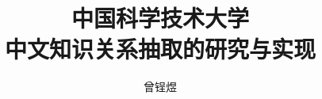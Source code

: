 \documentclass[bachelor]{ustcthesis}
\title{中国科学技术大学\\中文知识关系抽取的研究与实现}
\author{曾锃煜}
\begin{document}
\maketitle

%
%
%

\frontmatter

\tableofcontents
\listoffigures
\listoftables
\listofalgorithms  %


\mainmatter






\end{document}
